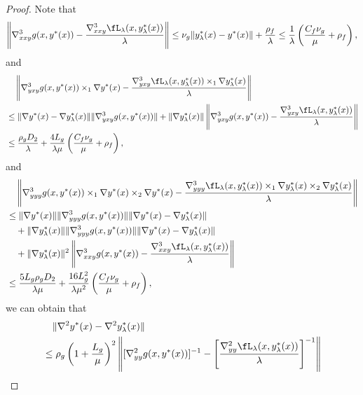 \begin{proof}
Note that 
\begin{align*}
    \left \Vert  \nabla_{xxy}^3  g(x,y^*(x)) - \frac{\nabla_{xxy}^3 \fL_{\lambda} (x,y_{\lambda}^*(x))  }{\lambda}   \right \Vert \le \nu_g \Vert y_{\lambda}^*(x) - y^*(x) \Vert + \frac{\rho_f}{\lambda} \le \frac{1}{\lambda} \left(\frac{C_f \nu_g}{\mu} +\rho_f \right),
\end{align*}
and
\begin{align*}
    &\quad \left \Vert 
    \nabla_{yxy}^3 g(x,y^*(x)) \times_1 \nabla y^*(x)  - \frac{\nabla_{yxy}^3 \fL_{\lambda} (x,y_{\lambda}^*(x)) \times_1 \nabla y_{\lambda}^*(x) }{\lambda}
    \right \Vert \\
    &\le \Vert \nabla y^*(x) - \nabla y_{\lambda}^*(x) \Vert \Vert \nabla_{yxy}^3 g(x,y^*(x)) \Vert + \Vert \nabla y_{\lambda}^*(x) \Vert \left\Vert \nabla_{yxy}^3 g(x,y^*(x)) - \frac{\nabla_{yxy}^3 \fL_{\lambda}(x, y_{\lambda}^*(x))}{\lambda} \right \Vert \\
    &\le \frac{\rho_g D_2}{\lambda} + \frac{4L_g}{\lambda \mu} \left( \frac{C_f \nu_g}{\mu} + \rho_f \right),
\end{align*}
and
{ 
\begin{align*}
    &\quad  \left \Vert
   \nabla_{yyy}^3 g(x,y^*(x)) \times_1  \nabla y^*(x)  \times_2 \nabla y^*(x)  - \frac{\nabla_{yyy}^3 \fL_{\lambda} (x,y_{\lambda}^*(x)) \times_1 \nabla y_{\lambda}^*(x) \times_2  \nabla y_{\lambda}^*(x)} { \lambda}
    \right \Vert \\
    &\le \Vert \nabla y^*(x) \Vert \Vert \nabla_{yyy}^3 g(x,y^*(x))\Vert \Vert \nabla y^*(x) - \nabla y_{\lambda}^*(x) \Vert  \\
    &\quad + \Vert \nabla y_{\lambda}^*(x) \Vert \Vert \nabla_{yyy}^3 g(x,y^*(x))\Vert \Vert \nabla y^*(x) - \nabla y_{\lambda}^*(x) \Vert  \\
    &\quad +  \Vert \nabla y_{\lambda}^*(x) \Vert^2  \left \Vert  \nabla_{xxy}^3  g(x,y^*(x)) - \frac{\nabla_{xxy}^3 \fL_{\lambda} (x,y_{\lambda}^*(x))  }{\lambda}   \right \Vert \\
    &\le  \frac{5L_g \rho_g D_2}{\lambda \mu} + \frac{16L_g^2 }{\lambda \mu^2} \left( \frac{C_f \nu_g}{\mu} + \rho_f \right),
\end{align*}}
we can obtain that
{
\begin{align*}
    &\quad \Vert \nabla^2 y^*(x) - \nabla^2 y_{\lambda}^*(x) \Vert  \\
    &\le \rho_g \left( 1 + \frac{L_g}{\mu}\right)^2 \left \Vert [\nabla_{yy}^2 g(x,y^*(x))]^{-1} - \left [  \frac{\nabla_{yy}^2 \fL_{\lambda}(x,y_{\lambda}^*(x))}{\lambda} \right]^{-1}  \right \Vert \\

\end{align*}}
\end{proof}
